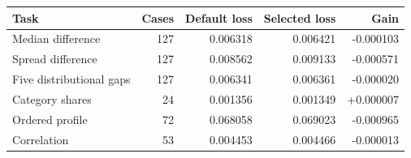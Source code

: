 \begin{tabular}{lrrrr}
\toprule Task & Cases & Default loss & Selected loss & Gain\\\midrule
Median difference & 127 & 0.006318 & 0.006421 & -0.000103\\
Spread difference & 127 & 0.008562 & 0.009133 & -0.000571\\
Five distributional gaps & 127 & 0.006341 & 0.006361 & -0.000020\\
Category shares & 24 & 0.001356 & 0.001349 & +0.000007\\
Ordered profile & 72 & 0.068058 & 0.069023 & -0.000965\\
Correlation & 53 & 0.004453 & 0.004466 & -0.000013\\
\bottomrule\end{tabular}